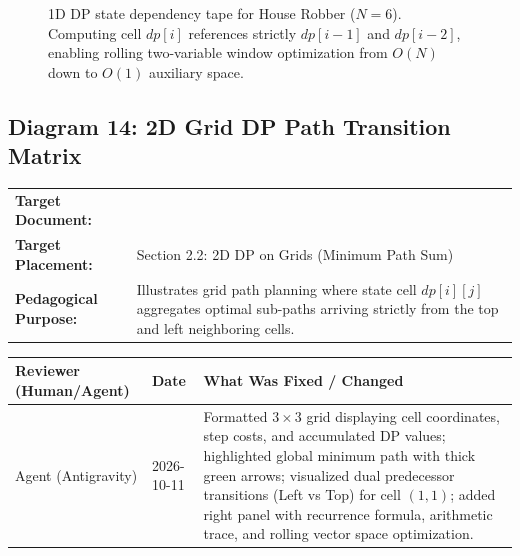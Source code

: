 \documentclass[11pt,a4paper]{article}
\newcommand{\breadcrumb}[3]{
    \par\vspace{0.15cm}
    \noindent\begin{tabularx}{\textwidth}{|l|X|}
    \hline
    \textbf{Target Document:} & \texttt{\detokenize{#1}} \\
    \textbf{Target Placement:} & #2 \\
    \textbf{Pedagogical Purpose:} & #3 \\
    \hline
    \end{tabularx}
    \vspace{0.15cm}\par
}
\newcommand{\diagramaudit}[3]{
    \par\vspace{0.12cm}
    \noindent\begin{tabularx}{\textwidth}{|l|l|>{\raggedright\arraybackslash}X|}
    \hline
    \textbf{Reviewer (Human/Agent)} & \textbf{Date} & \textbf{What Was Fixed / Changed} \\ \hline
    #1 & #2 & #3 \\ \hline
    \end{tabularx}
    \vspace{0.12cm}\par
}
\begin{document}
\begin{figure}[htbp]
\caption{1D DP state dependency tape for House Robber ($N=6$). Computing cell $dp[i]$ references strictly $dp[i-1]$ and $dp[i-2]$, enabling rolling two-variable window optimization from $O(N)$ down to $O(1)$ auxiliary space.}
\end{figure}

\newpage
\subsection{Diagram 14: 2D Grid DP Path Transition Matrix}

\breadcrumb{06.dynamic_programming.tex}{Section 2.2: 2D DP on Grids (Minimum Path Sum)}{Illustrates grid path planning where state cell $dp[i][j]$ aggregates optimal sub-paths arriving strictly from the top and left neighboring cells.}

\diagramaudit{Agent (Antigravity)}{2026-10-11}{Formatted $3 \times 3$ grid displaying cell coordinates, step costs, and accumulated DP values; highlighted global minimum path with thick green arrows; visualized dual predecessor transitions (Left vs Top) for cell $(1,1)$; added right panel with recurrence formula, arithmetic trace, and rolling vector space optimization.}
\end{document}
